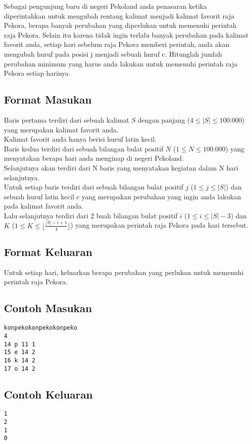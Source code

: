 \documentclass{article}
\begin{document}
Sebagai pengunjung baru di negeri Pekoland anda penasaran ketika diperintahkan untuk mengubah rentang kalimat menjadi kalimat favorit raja Pekora, berapa banyak perubahan yang diperlukan untuk memenuhi perintah raja Pekora. Selain itu karena tidak ingin terlalu banyak perubahan pada kalimat favorit anda, setiap hari sebelum raja Pekora memberi perintah, anda akan mengubah huruf pada posisi j menjadi sebuah huruf c. Hitunglah jumlah perubahan minimum yang harus anda lakukan untuk memenuhi perintah raja Pekora setiap harinya.


\subsection*{Format Masukan}

Baris pertama terdiri dari sebuah kalimat $S$ dengan panjang ($ 4 \leq |S| \leq 100.000$) yang merupakan kalimat favorit anda.\\
Kalimat favorit anda hanya berisi huruf latin kecil.\\
Baris kedua terdiri dari sebuah bilangan bulat positif $N$ ($1 \leq N \leq 100.000$) yang menyatakan berapa hari anda menginap di negeri Pekoland.\\
Selanjutnya akan terdiri dari N baris yang menyatakan kegiatan dalam N hari selanjutnya.\\
Untuk setiap baris terdiri dari sebuah bilangan bulat positif $j$ ($1 \leq j \leq |S|$) dan sebuah huruf latin kecil $c$ yang merupakan perubahan yang ingin anda lakukan pada kalimat favorit anda.\\
Lalu selanjutnya terdiri dari 2 buah bilangan bulat positif $i$ ($1 \leq i \leq |S| - 3$) dan $K$ ($1 \leq K \leq \lfloor \frac{|S|-i+1}{4}\rfloor$) yang merupakan perintah raja Pekora pada hari tersebut.

\subsection*{Format Keluaran}

Untuk setiap hari, keluarkan berapa perubahan yang perlukan untuk memenuhi perintah raja Pekora.

\begin{multicols}{2}
\subsection*{Contoh Masukan}
\begin{lstlisting}
konpekokonpekokonpeko
4
14 p 11 1
15 e 14 2
16 k 14 2
17 o 14 2
\end{lstlisting}
\columnbreak
\subsection*{Contoh Keluaran}
\begin{lstlisting}
1
2
1
0
\end{lstlisting}
\vfill
\null
\end{multicols}
\end{document}
